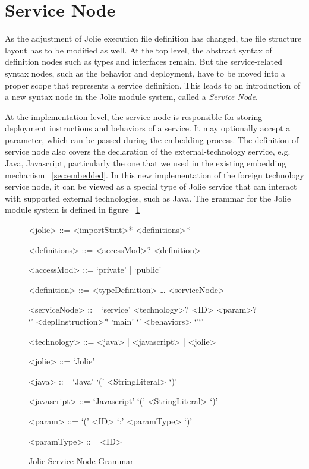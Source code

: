 \section{Service Node}

As the adjustment of Jolie execution file definition has changed, the file structure layout has to be modified as well.  At the top level, the abstract syntax of definition nodes such as types and interfaces remain. But the service-related syntax nodes, such as the behavior and deployment, have to be moved into a proper scope that represents a service definition. This leads to an introduction of a new syntax node in the Jolie module system, called a \textit{Service Node}.

At the implementation level, the service node is responsible for storing deployment instructions and behaviors of a service. It may optionally accept a parameter, which can be passed during the embedding process.
The definition of service node also covers the declaration of the external-technology service, e.g. Java, Javascript, particularly the one that we used in the existing embedding mechanism ~\ref{sec:embedded}.
In this new implementation of the foreign technology service node, it can be viewed as a special type of Jolie service that can interact with supported external technologies, such as Java.
The grammar for the Jolie module system is defined in figure ~\ref{fig:jolie-servicenode-grammar}

\begin{figure}[h]
    \begin{framed}
        \begin{grammar}
            <jolie> ::= <importStmt>* <definitions>*

            <definitions> ::= <accessMod>? <definition>

            <accessMod> ::= `private' | `public'

            <definition> ::=  <typeDefinition>
            \dots
            \alt <serviceNode>

            <serviceNode> ::= `service' <technology>? <ID> <param>? \\ `{' <deplInstruction>* `main' `{' <behaviors> `}'`}'

            <technology> ::= <java> | <javascript> | <jolie>

            <jolie> ::= `Jolie'

            <java> ::= `Java' `(' <StringLiteral> `)'

            <javascript> ::= `Javascript' `(' <StringLiteral> `)'

            <param> ::= `(' <ID> `:' <paramType> `)'

            <paramType> ::= <ID>
        \end{grammar}
    \end{framed}
    \caption{Jolie Service Node Grammar}
    \label{fig:jolie-servicenode-grammar}
\end{figure}

